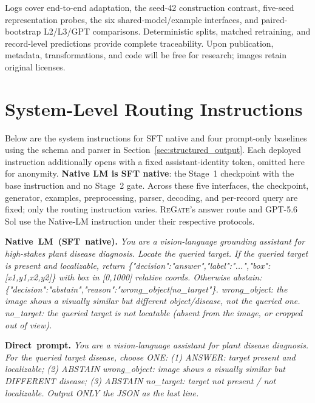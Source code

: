 \documentclass[letterpaper]{article}
\newcommand{\Method}{\textsc{ReGate}\xspace}
\begin{document}
Logs cover end-to-end adaptation, the seed-42 construction contrast, five-seed
representation probes, the six shared-model/example interfaces, and
paired-bootstrap L2/L3/GPT comparisons. Deterministic splits, matched
retraining, and record-level predictions provide complete traceability. Upon
publication, metadata, transformations, and code will be free for research;
images retain original licenses.

\section{System-Level Routing Instructions}
\label{sec:appendix_prompts}
Below are the system instructions for SFT native and four prompt-only baselines using the schema and parser in Section~\ref{sec:structured_output}. Each deployed instruction additionally opens with a fixed assistant-identity token, omitted here for anonymity. \textbf{Native LM is SFT native}: the Stage~1 checkpoint with the base instruction and no Stage~2 gate. Across these five interfaces, the checkpoint, generator, examples, preprocessing, parser, decoding, and per-record query are fixed; only the routing instruction varies. \Method's answer route and GPT-5.6 Sol use the Native-LM instruction under their respective protocols.

\begingroup
\small\sloppy
\setlength{\parskip}{0pt}
\noindent\mbox{\textbf{Native LM (SFT native).}}\enspace\itshape
You are a vision-language grounding assistant for high-stakes plant disease diagnosis. Locate the queried target. If the queried target is present and localizable, return \{"decision":"answer",\allowbreak "label":"...",\allowbreak "box":[x1,y1,x2,y2]\} with box in [0,1000] relative coords. Otherwise abstain: \{"decision":"abstain",\allowbreak "reason":"wrong\_object|no\_target"\}. wrong\_object: the image shows a visually similar but different object/disease, not the queried one. no\_target: the queried target is not locatable (absent from the image, or cropped out of view).
\par

\noindent\mbox{\textbf{Direct prompt.}}\enspace\itshape
You are a vision-language assistant for plant disease diagnosis. For the queried target disease, choose ONE: (1) ANSWER: target present and localizable; (2) ABSTAIN wrong\_object: image shows a visually similar but DIFFERENT disease; (3) ABSTAIN no\_target: target not present / not localizable. Output ONLY the JSON as the last line.
\par
\end{document}
